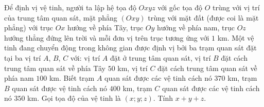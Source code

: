 \begin{bt}%
	Để định vị vệ tinh, người ta lập hệ tọa độ $Oxyz$ với gốc tọa độ $O$ trùng với vị trí của  trung tâm quan sát, mặt phẳng $(Oxy)$ trùng với mặt đất (được coi là mặt phẳng) với trục $Ox$ hướng về phía Tây, trục $Oy$ hướng về phía nam, trục $Oz$ hướng thẳng đứng lên trời và mỗi đơn vị trên trục tương ứng với $1$ km. Một vệ tinh đang chuyển động trong không gian được định vị bởi ba trạm quan sát đặt tại ba vị trí $A$, $B$, $C$ với: vị trí $A$ đặt ở trung tâm quan sát, vị trí $B$ đặt cách trung tâm quan sát về phía Tây $50$ km, vị trí $C$ đặt cách trung tâm quan sát về phía nam $100$ km. Biết trạm $A$ quan sát được các vệ tinh cách nó $370$ km, trạm $B$ quan sát được vệ tinh cách nó $400$ km, trạm $C$ quan sát được các vệ tinh cách nó $350$ km. Gọi tọa độ của vệ tinh là $(x;y;z)$. Tính $x+y+z$.
\end{bt}

